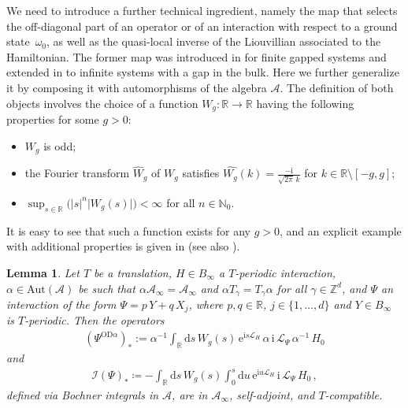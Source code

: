 \documentclass[a4paper]{article}
\newcommand{\e}{\mathrm{e}}
\renewcommand{\i}{\mathrm{i}}
\renewcommand{\Psi}{\varPsi}
\newcommand{\g}{\gamma}
\newcommand{\w}{\omega}
\newcommand{\N}{\mathbb{N}}
\newcommand{\Z}{\mathbb{Z}}
\newcommand{\mA}{\mathcal{A}}
\newcommand{\R}{\mathbb{R}}
\newcommand{\OD}[1][]{   ^{\mathrm{OD}#1}   }
\newcommand{\mL}{\mathcal{L}}
\theoremstyle{plain}
\newtheorem{lemma}[theorem]{Lemma}
\theoremstyle{definition}
\theoremstyle{remark}
\renewcommand{\(}{\left(}
\renewcommand{\)}{\right)}
\begin{document}
We need to introduce a further technical ingredient, namely the map that selects the off-diagonal part of an operator or of an interaction with respect to a ground state~$\w_0$, as well as the quasi-local inverse of the Liouvillian associated to the Hamiltonian. The former  map was  introduced in \cite{hastings2005quasiadiabatic,BMNS12} for finite gapped systems and extended in \cite{MO20} to infinite systems with a gap in the bulk. Here we further generalize it by composing it with automorphisms of the algebra $\mA$.
 The definition of both objects involves the choice of a function 
$W_g: \R\to \R$  having the following properties for some $g>0$:
    \begin{itemize}
        \item[(i)] $W_g$ is odd;
        \item[(ii)] the Fourier transform $\widehat W_g$ of $W_g$ satisfies $\widehat{W_g}(k) = \frac{- \i}{\sqrt{2  \pi}\, k}$ for  $k \in \R \setminus [-g,g]$;
        \item[(iii)] $\sup_{s\in \R} \bigl( \lvert s \rvert ^n \lvert W_g(s) \rvert \bigr) < \infty$ for all $n\in\N_0$. 
    \end{itemize}
 It is easy to see that such a function exists for any $g>0$, and an explicit example with additional properties is given in \cite[Lemma 2.6]{BMNS12} (see also \cite[Lemma 2.3 and Equation 2.12]{BMNS12}).
 



\medskip




\begin{lemma}\label{lem: almost local obs. for OD and inv. liou.}
    Let $T$ be a translation, $H\in B_\infty$ a $T$-periodic interaction, $\alpha\in \mathrm{Aut}(\mA)$ be such that $\alpha \mA_\infty = \mA_\infty $ and $\alpha T_\g = T_\g \alpha$ for all $\g \in \Z^d$, and $\Psi$ an interaction of the form $\Psi= p\, Y + q\, X_j$, where $p,q \in \R$, $j\in\{1,\dots,d\}$ and $Y \in B_\infty$ is   $T$-periodic. Then the operators 
    \begin{align*}
        (\Psi\OD[\alpha])_* :=  \alpha^{-1} \int_{\R}\mathrm{d}s \, W_g(s) \, \e^{\i s\mL_{H}} \,  \alpha \,  \i \,\mL_\Psi \, \alpha^{-1} \, H_0
    \end{align*}
    and
    \begin{align*}
        \mathcal{I}(\Psi)_* \coloneq  - \int_{\R}\mathrm{d}s \,W_g(s) \int_{0}^s \mathrm{d}u  \, \e^{\i u\mL_{H}} \, \i \, \mL_\Psi \, H_0 \, ,
    \end{align*}
    defined  via Bochner integrals in  $\mathcal{A}$,
    are in $\mA_\infty$, self-adjoint, and $T$-compatible.
\end{lemma}
\end{document}

